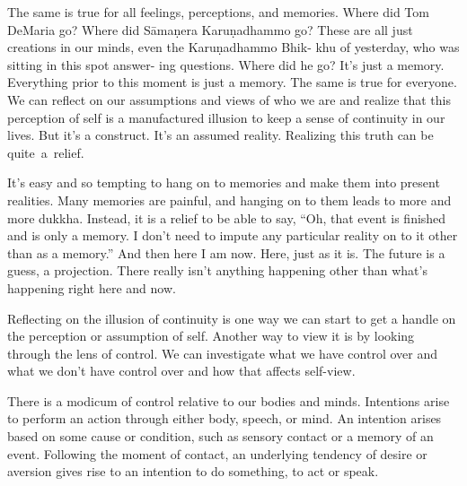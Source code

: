 The same is true for all feelings, perceptions, and memories. Where did Tom DeMaria go? Where did Sāmaṇera Karuṇadhammo go? These are all just creations in our minds, even the Karuṇadhammo Bhik- \linebreak khu of yesterday, who was sitting in this spot answer- \linebreak ing questions. Where did he go? It's just a memory. Everything prior to this moment is just a memory. The \linebreak same is true for everyone. We can reflect on our assumptions and views of who we are and realize that this perception of self is a manufactured illusion to keep a sense of continuity in our lives. But it's a construct. It's an assumed reality. Realizing this truth can be \mbox{quite a relief.}

It's easy and so tempting to hang on to memories and make them into present realities. Many memories are painful, and hanging on to them leads to more and more dukkha. Instead, it is a relief to be able to say, ``Oh, that event is finished and is only a memory. I don't need to impute any particular reality on to it other than as a memory.'' And then here I am now. Here, just as it is. The future is a guess, a projection. There really isn't anything happening other than what's happening right here and now.

Reflecting on the illusion of continuity is one way we can start to get a handle on the perception or assumption of self. Another way to view it is by looking through the lens of control. We can investigate what we have control over and what we don't have control over and how that affects self-view.

There is a modicum of control relative to our bodies and minds. Intentions arise to perform an action through either body, speech, or mind. An intention arises based on some cause or condition, such as sensory contact or a memory of an event. Following the moment of contact, an underlying tendency of desire or aversion gives rise to an intention to do something, to act or speak.

